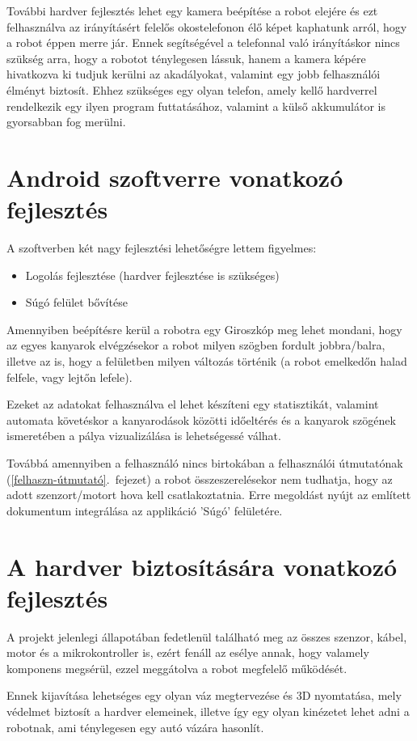 \documentclass[]{thesis-ekf}
\theoremstyle{definition}
\begin{document}
További hardver fejlesztés lehet egy kamera beépítése a robot elejére és ezt felhasználva az irányításért felelős okostelefonon élő képet kaphatunk arról, hogy a robot éppen merre jár. Ennek segítségével a telefonnal való irányításkor nincs szükség arra, hogy a robotot ténylegesen lássuk, hanem a kamera képére hivatkozva ki tudjuk kerülni az akadályokat, valamint egy jobb felhasználói élményt biztosít. Ehhez szükséges egy olyan telefon, amely kellő hardverrel rendelkezik egy ilyen program futtatásához, valamint a külső akkumulátor is gyorsabban fog merülni.
\section{Android szoftverre vonatkozó fejlesztés}
A szoftverben két nagy fejlesztési lehetőségre lettem figyelmes:
\begin{itemize}
	\item Logolás fejlesztése (hardver fejlesztése is szükséges)
	\item Súgó felület bővítése
\end{itemize}
Amennyiben beépítésre kerül a robotra egy Giroszkóp meg lehet mondani, hogy az egyes kanyarok elvégzésekor a robot milyen szögben fordult jobbra/balra, illetve az is, hogy a felületben milyen változás történik (a robot emelkedőn halad felfele, vagy lejtőn lefele).

Ezeket az adatokat felhasználva el lehet készíteni egy statisztikát, valamint automata követéskor a kanyarodások közötti időeltérés és a kanyarok szögének ismeretében a pálya vizualizálása is lehetségessé válhat.

Továbbá amennyiben a felhasználó nincs birtokában a felhasználói útmutatónak (\ref{felhaszn-útmutató}.~fejezet) a robot összeszerelésekor nem tudhatja, hogy az adott szenzort/motort hova kell csatlakoztatnia. Erre megoldást nyújt az említett dokumentum integrálása az applikáció 'Súgó' felületére.
\section{A hardver biztosítására vonatkozó fejlesztés}
A projekt jelenlegi állapotában fedetlenül található meg az összes szenzor, kábel, motor és a mikrokontroller is, ezért fenáll az esélye annak, hogy valamely komponens megsérül, ezzel meggátolva a robot megfelelő működését.

Ennek kijavítása lehetséges egy olyan váz megtervezése és 3D nyomtatása, mely védelmet biztosít a hardver elemeinek, illetve így egy olyan kinézetet lehet adni a robotnak, ami ténylegesen egy autó vázára hasonlít.
\end{document}
